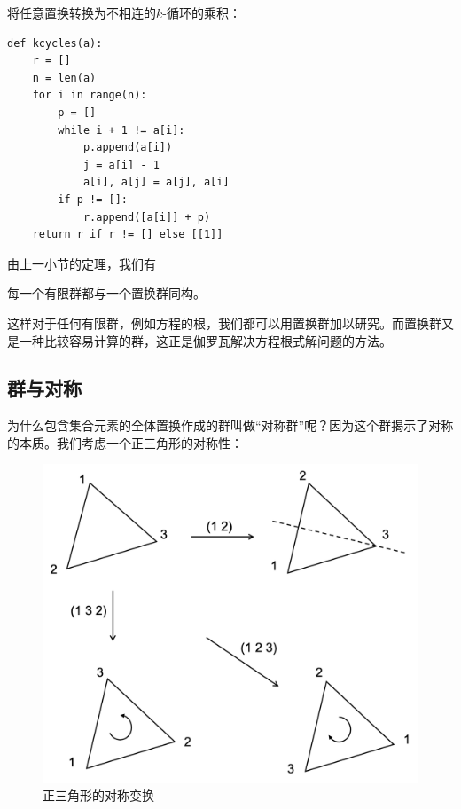 \documentclass[b5paper]{ctexart}
\begin{document}
将任意置换转换为不相连的$k$-循环的乘积：
\lstset{language=Python}
\begin{lstlisting}
def kcycles(a):
    r = []
    n = len(a)
    for i in range(n):
        p = []
        while i + 1 != a[i]:
            p.append(a[i])
            j = a[i] - 1
            a[i], a[j] = a[j], a[i]
        if p != []:
            r.append([a[i]] + p)
    return r if r != [] else [[1]]
\end{lstlisting}

由上一小节的定理，我们有

\begin{theorem}
每一个有限群都与一个置换群同构。
\end{theorem}

这样对于任何有限群，例如方程的根，我们都可以用置换群加以研究。而置换群又是一种比较容易计算的群，这正是伽罗瓦解决方程根式解问题的方法。

\begin{Exercise}
\end{Exercise}

\subsection{群与对称}

为什么包含集合元素的全体置换作成的群叫做“对称群”呢？因为这个群揭示了对称的本质。我们考虑一个正三角形的对称性：

\begin{figure}[htbp]
 \centering
 \includegraphics[scale=0.5]{img/s3-examples.png}
 \caption{正三角形的对称变换}
 \label{fig:S3-examples}
\end{figure}
\end{document}
